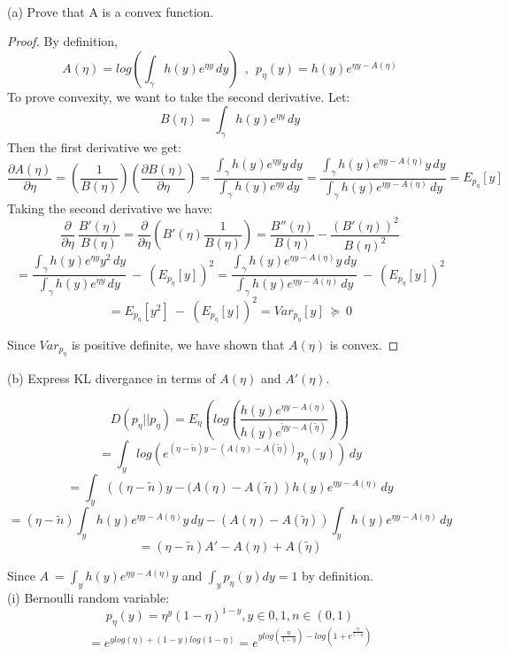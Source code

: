 \documentclass[11pt]{article}
\newenvironment{problem}[2][Problem]{\begin{trivlist}
\item[\hskip \labelsep {\bfseries #1}\hskip \labelsep {\bfseries #2.}]}{\end{trivlist}}
\begin{document}
\begin{problem}{2.2}
\text{ }\\

(a) Prove that A is a convex function.
\begin{proof}
By definition, 
\[ A(\eta) = log(\int_\gamma h(y)e^{\eta y}\,dy )~~,~~p_{\eta}(y) = h(y)e^{\eta y-A(\eta)} \]
To prove convexity, we want to take the second derivative. Let:
\[B(\eta) = \int_\gamma h(y)e^{\eta y}\,dy \]
Then the first derivative we get:
\[ \frac{\partial A(\eta)}{\partial \eta}
   = \left( \frac{1}{B(\eta)}\right)
     \left(\frac{\partial B(\eta)}{\partial \eta}\right) 
   = \frac{\int_\gamma h(y)e^{\eta y} y \,dy}{\int_\gamma h(y)e^{\eta y}\,dy}
   = \frac{\int_\gamma h(y)e^{\eta y - A(\eta)} y \,dy}{\int_\gamma h(y)e^{\eta y - A(\eta)}\,dy}
   =E_{p_{\eta}}[y]\]
Taking the second derivative we have:
\[ \frac{\partial}{\partial \eta}~\frac{B'(\eta)}{B(\eta)}
   = \frac{\partial}{\partial \eta}\left( B'(\eta)\frac{1}{B(\eta)}\right)
   = \frac{B''(\eta)}{B(\eta)} - \frac{(B'(\eta))^2}{B(\eta)^2}\]
\[= \frac{\int_\gamma h(y)e^{\eta y} y^2 \,dy}{\int_\gamma h(y)e^{\eta y}\,dy}~-~(E_{p_{\eta}}[y])^2
   = \frac{\int_\gamma h(y)e^{\eta y - A(\eta)} y \,dy}{\int_\gamma h(y)e^{\eta y - A(\eta)}\,dy}~-~(E_{p_{\eta}}[y])^2\]
\[ = E_{p_{\eta}}[y^2]~-~(E_{p_{\eta}}[y])^2 
   = Var_{p_{\eta}}[y] ~\succeq~0 \]

Since $Var_{p_{\eta}}$ is positive definite, we have shown that $A(\eta)$ is convex.
\end{proof}

(b) Express KL divergance in terms of $A(\eta)$ and $A'(\eta)$. 

\[ D(p_{\eta} || p_{\eta}) = E_{\eta} \left(log(\frac{h(y)e^{\eta y - A(\eta)}}{h(y)e^{\tilde \eta y - A(\tilde \eta)}})\right)\]
\[= \int_y log \left(e^{(\eta - \tilde{n})y - (A(\eta) - A(\tilde{\eta}))} p_{\eta}(y) \right) \,dy \]
\[= \int_y \left((\eta - \tilde{n})y - (A(\eta) - A(\tilde{\eta})\right) h(y)e^{\eta y - A(\eta)} \,dy \]
\[= (\eta - \tilde{n})\int_y h(y)e^{\eta y - A(\eta)}y \,dy - (A(\eta) - A(\tilde{\eta})) \int_y h(y)e^{\eta y - A(\eta)} \,dy \]
\[= (\eta - \tilde{n})A' - A(\eta) + A(\tilde{\eta}) \]

Since $A\ = \int_y h(y)e^{\eta y - A(\eta)}y $ and $\int_y p_{\eta}(y)dy = 1 $ by definition.
\\

(i) Bernoulli random variable:
\\
\[p_{\eta}(y) = \eta^{y}(1-\eta)^{1-y}, y \in {0,1}, n \in (0,1)\]
\[ = e^{ylog(\eta) + (1-y)log(1-\eta)} = e^{ylog(\frac{\eta}{1-\eta}) - log(1+e^{\frac{\eta}{1-\eta}})}\]


\end{problem}
\end{document}
